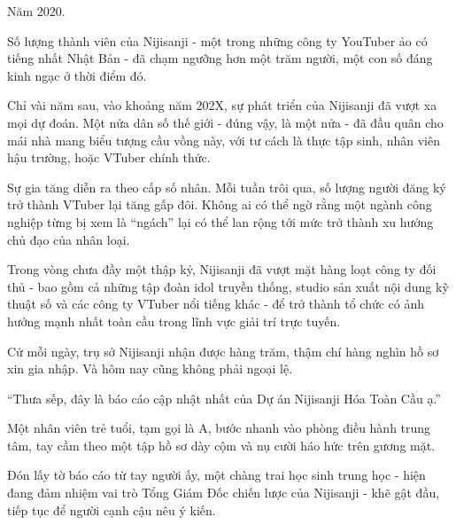 \documentclass[../main.tex]{subfiles}
\begin{document}

Năm 2020.

Số lượng thành viên của Nijisanji - một trong những công ty YouTuber ảo có tiếng nhất Nhật Bản - đã chạm ngưỡng hơn một trăm người, một con số đáng kinh ngạc ở thời điểm đó.

Chỉ vài năm sau, vào khoảng năm 202X, sự phát triển của Nijisanji đã vượt xa mọi dự đoán. Một nửa dân số thế giới - đúng vậy, là một nửa - đã đầu quân cho mái nhà mang biểu tượng cầu vồng này, với tư cách là thực tập sinh, nhân viên hậu trường, hoặc VTuber chính thức.

Sự gia tăng diễn ra theo cấp số nhân. Mỗi tuần trôi qua, số lượng người đăng ký trở thành VTuber lại tăng gấp đôi. Không ai có thể ngờ rằng một ngành công nghiệp từng bị xem là ``ngách'' lại có thể lan rộng tới mức trở thành xu hướng chủ đạo của nhân loại.

Trong vòng chưa đầy một thập kỷ, Nijisanji đã vượt mặt hàng loạt công ty đối thủ - bao gồm cả những tập đoàn idol truyền thống, studio sản xuất nội dung kỹ thuật số và các công ty VTuber nổi tiếng khác - để trở thành tổ chức có ảnh hưởng mạnh nhất toàn cầu trong lĩnh vực giải trí trực tuyến.

Cứ mỗi ngày, trụ sở Nijisanji nhận được hàng trăm, thậm chí hàng nghìn hồ sơ xin gia nhập. Và hôm nay cũng không phải ngoại lệ.

\ct

``Thưa sếp, đây là báo cáo cập nhật nhất của Dự án Nijisanji Hóa Toàn Cầu ạ.''

Một nhân viên trẻ tuổi, tạm gọi là A, bước nhanh vào phòng điều hành trung tâm, tay cầm theo một tập hồ sơ dày cộm và nụ cười háo hức trên gương mặt.

Đón lấy tờ báo cáo từ tay người ấy, một chàng trai học sinh trung học - hiện đang đảm nhiệm vai trò Tổng Giám Đốc chiến lược của Nijisanji - khẽ gật đầu, tiếp tục để người cạnh cậu nêu ý kiến.
\end{document}
